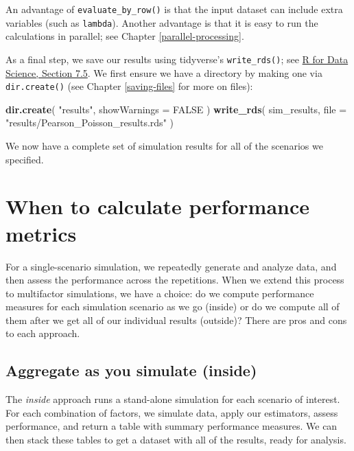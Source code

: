 \documentclass[
]{book}
\newenvironment{Shaded}{\begin{snugshade}}{\end{snugshade}}
\newcommand{\AttributeTok}[1]{\textcolor[rgb]{0.13,0.29,0.53}{#1}}
\newcommand{\ConstantTok}[1]{\textcolor[rgb]{0.56,0.35,0.01}{#1}}
\newcommand{\FunctionTok}[1]{\textcolor[rgb]{0.13,0.29,0.53}{\textbf{#1}}}
\newcommand{\NormalTok}[1]{#1}
\newcommand{\StringTok}[1]{\textcolor[rgb]{0.31,0.60,0.02}{#1}}
\begin{document}
An advantage of \texttt{evaluate\_by\_row()} is that the input dataset can include extra variables (such as \texttt{lambda}).
Another advantage is that it is easy to run the calculations in parallel; see Chapter \ref{parallel-processing}.

As a final step, we save our results using tidyverse's \texttt{write\_rds()}; see \href{https://r4ds.hadley.nz/data-import.html\#sec-writing-to-a-file}{R for Data Science, Section 7.5}.
We first ensure we have a directory by making one via \texttt{dir.create()} (see Chapter \ref{saving-files} for more on files):

\begin{Shaded}
\begin{Highlighting}[]
\FunctionTok{dir.create}\NormalTok{( }\StringTok{"results"}\NormalTok{, }\AttributeTok{showWarnings =} \ConstantTok{FALSE}\NormalTok{ )}
\FunctionTok{write\_rds}\NormalTok{( sim\_results, }\AttributeTok{file =} \StringTok{"results/Pearson\_Poisson\_results.rds"}\NormalTok{ )}
\end{Highlighting}
\end{Shaded}

We now have a complete set of simulation results for all of the scenarios we specified.

\section{When to calculate performance metrics}\label{when-to-calculate-performance-metrics}

For a single-scenario simulation, we repeatedly generate and analyze data, and then assess the performance across the repetitions.
When we extend this process to multifactor simulations, we have a choice: do we compute performance measures for each simulation scenario as we go (inside) or do we compute all of them after we get all of our individual results (outside)?
There are pros and cons to each approach.

\subsection{Aggregate as you simulate (inside)}\label{aggregate-as-you-simulate-inside}

The \emph{inside} approach runs a stand-alone simulation for each scenario of interest. For each combination of factors, we simulate data, apply our estimators, assess performance, and return a table with summary performance measures. We can then stack these tables to get a dataset with all of the results, ready for analysis.
\end{document}
